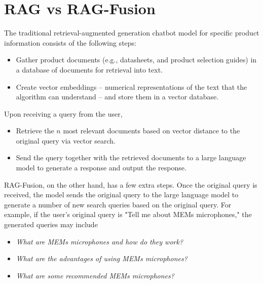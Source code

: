\documentclass{article}
\begin{document}
\section*{RAG vs RAG-Fusion}
\label{sec:headings}

The traditional retrieval-augmented generation chatbot model for specific product information consists of the following steps:
\begin{itemize}
\item Gather product documents (e.g., datasheets, and product selection guides) in a database of documents for retrieval into text.
\item Create vector embeddings -- numerical representations of the text that the algorithm can understand -- and store them in a vector database.
\end{itemize}\vspace*{3pt}
Upon receiving a query from the user,
\begin{itemize}
\item Retrieve the $n$ most relevant documents based on vector distance to the original query via vector search.
\item Send the query together with the retrieved documents to a large language model to generate a response and output the response.
\end{itemize}\vspace*{3pt}

RAG-Fusion, on the other hand, has a few extra steps. \cite{RAGGIT} Once the original query is received, the model sends the original query to the large language model to generate a number of new search queries based on the original query. For example, if the user's original query is "Tell me about MEMs microphones," the generated queries may include
\begin{itemize}
\item \textit{What are MEMs microphones and how do they work?}
\item \textit{What are the advantages of using MEMs microphones?}
\item \textit{What are some recommended MEMs microphones?}
\end{itemize}
\end{document}
